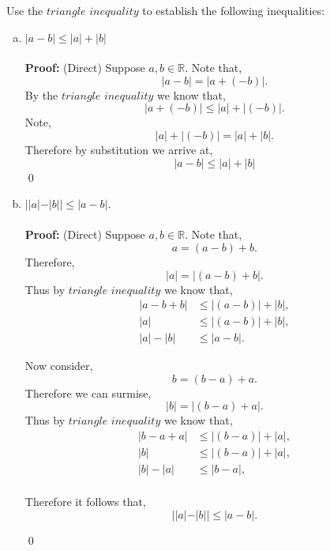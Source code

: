 \documentclass[12pt]{article}
\makeatletter
\theoremstyle{homework}
\newenvironment{exercise}[1]
{\def\@currentlabel{#1}\exercisecore}
{\endexercisecore}
\newcommand{\Reals}{\ensuremath{\mathbb R}}
\let\RR\Reals
\makeatother
\begin{document}
\begin{exercise}{1.2.6}
Use the $triangle$ $inequality$ to establish the following inequalities:
\begin{enumerate}[(a)]
\item $|a-b| \leq |a| + |b|$\\\\
\textbf{Proof:} (Direct) Suppose $a,b \in \RR$. Note that, 
\begin{equation*}
  |a-b| = |a + (-b)|.
\end{equation*}
By the $triangle$ $inequality$ we know that,
\begin{equation*}
  |a + (-b)| \leq |a| + |(-b)|.
\end{equation*}
Note,
\begin{equation*}
  |a| + |(-b)| = |a| + |b|.
\end{equation*}
Therefore by substitution we arrive at,
\begin{equation*}
  |a-b| \leq |a| + |b|
\end{equation*}
 \qed


 \item $||a|-|b|| \le |a-b|$.\\\\
 \textbf{Proof:} (Direct) Suppose $a,b \in \RR$. Note that, 
 \begin{equation*}
  a = (a-b) + b.
\end{equation*}
Therefore,
\begin{equation*}
  |a| = |(a-b) + b|.
\end{equation*}
Thus by $triangle$ $inequality$ we know that,
\begin{align*}
  |a-b+b| &\leq |(a-b)| + |b|,\\
  |a| &\leq |(a-b)| + |b|,\\
  |a| - |b| &\leq |a-b|.
\end{align*}

Now consider,
\begin{equation*}
  b = (b-a) + a.
\end{equation*}
Therefore we can surmise,
\begin{equation*}
  |b| = |(b-a) + a|.
\end{equation*}
Thus by $triangle$ $inequality$ we know that,
\begin{align*}
  |b-a+a| &\leq |(b-a)| + |a|,\\
  |b| &\leq |(b-a)| + |a|,\\
  |b| - |a| &\leq |b-a|,\\
\end{align*}

Therefore it follows that,
\begin{equation*}
  ||a|-|b|| \le |a-b|.
\end{equation*}





\qed
\end{enumerate}
\end{exercise}
\vspace{1in}
\end{document}
